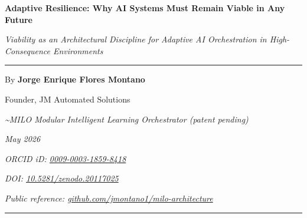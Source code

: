 \documentclass[11pt,letterpaper,oneside]{article}
\newcommand{\milotitle}{Adaptive Resilience: Why AI Systems Must Remain Viable in Any Future}
\newcommand{\milosubtitle}{Viability as an Architectural Discipline for Adaptive AI Orchestration in High-Consequence Environments}
\newcommand{\milodate}{May 2026}
\begin{document}
\thispagestyle{titlepage}
\begin{center}
\vspace*{0.2in}
{\sffamily\Large\bfseries\color{milonavy} \milotitle\par}
\vspace{0.15in}
{\itshape\normalsize \milosubtitle\par}
\vspace{0.18in}
{\color{milonavy}\rule{0.35\textwidth}{0.8pt}\par}
\vspace{0.18in}
{\large By \textbf{Jorge Enrique Flores Montano}\par}
{\normalsize Founder, JM Automated Solutions\par}
{\small\itshape\textcolor{black!70}{\textasciitilde MILO\texttrademark{} \textemdash{} Modular Intelligent Learning Orchestrator (patent pending)}\par}
{\small\itshape\textcolor{black!70}{\milodate}\par}
{\small\itshape\textcolor{black!70}{ORCID iD: \href{https://orcid.org/0009-0003-1859-8418}{0009-0003-1859-8418}}\par}
{\small\itshape\textcolor{black!70}{DOI: \href{https://doi.org/10.5281/zenodo.20117025}{10.5281/zenodo.20117025}}\par}
{\small\itshape\textcolor{black!70}{Public reference: \href{https://github.com/jmontano1/milo-architecture}{github.com/jmontano1/milo-architecture}}\par}
\vspace{0.15in}
{\color{milonavy}\rule{\textwidth}{0.6pt}\par}
\end{center}


\end{document}
